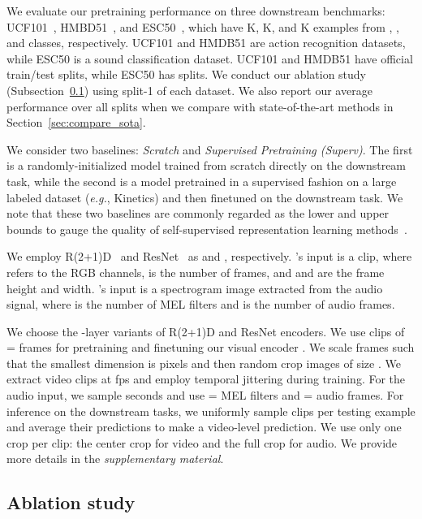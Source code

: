 \documentclass{article}
\begin{document}
We evaluate our pretraining performance on three downstream benchmarks: UCF101~\cite{UCF101}, HMBD51~\cite{HMDB51}, and ESC50~\cite{esc50}, which have K, K, and K examples from , , and  classes, respectively. UCF101 and HMDB51 are action recognition datasets, while ESC50 is a sound classification dataset. UCF101 and HMDB51 have  official train/test splits, while ESC50 has  splits. We conduct our ablation study (Subsection~\ref{sec:ablation_study}) using split-1 of each dataset. We also report our average performance over all splits when we compare with state-of-the-art methods in Section~\ref{sec:compare_sota}.

We consider two baselines: \textit{{Scratch}} and \textit{{Supervised Pretraining (Superv)}}. The first is a randomly-initialized model trained from scratch directly on the downstream task, while the second is a model pretrained in a supervised fashion on a large labeled dataset (\emph{e.g.}, Kinetics) and then finetuned on the downstream task. We note that these two baselines are commonly regarded as the lower and upper bounds to gauge the quality of self-supervised representation learning methods~\cite{Arandjelovic17,avts}.

We employ R(2+1)D~\cite{Tran18} and ResNet~\cite{KaimingHe16} as  and , respectively. 's input is a  clip, where  refers to the RGB channels,  is the number of frames, and  and  are the frame height and width. 's input is a  spectrogram image extracted from the audio signal, where  is the number of MEL filters and  is the number of audio frames. 

We choose the -layer variants of R(2+1)D and ResNet encoders. We use clips of = frames for pretraining and finetuning our visual encoder . We scale frames such that the smallest dimension is  pixels and then random crop images of size . We extract video clips at  fps and employ temporal jittering during training. 
For the audio input, we sample  seconds and use = MEL filters and = audio frames. For inference on the downstream tasks, we uniformly sample  clips per testing example and average their predictions to make a video-level prediction. We use only one crop per clip: the center  crop for video and the full  crop for audio. We provide more details in the \emph{supplementary material}.

\vspace{-1pt}
\subsection{Ablation study}\label{sec:ablation_study}
\vspace{-1pt}
\end{document}

